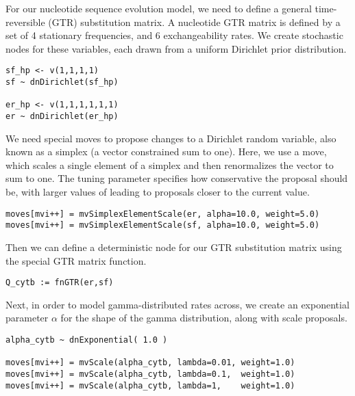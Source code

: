 For our nucleotide sequence evolution model, we need to define a general time-reversible (GTR) substitution matrix.
A nucleotide GTR matrix is defined by a set of 4 stationary frequencies, and 6 exchangeability rates.
We create stochastic nodes for these variables, each drawn from a uniform Dirichlet prior distribution.

{\tt \begin{snugshade*}
\begin{lstlisting}
sf_hp <- v(1,1,1,1)
sf ~ dnDirichlet(sf_hp)

er_hp <- v(1,1,1,1,1,1)
er ~ dnDirichlet(er_hp)
\end{lstlisting}
\end{snugshade*}}

We need special moves to propose changes to a Dirichlet random variable, also known as a simplex (a vector constrained sum to one).
Here, we use a  move, which scales a single element of a simplex and then renormalizes the vector to sum to one.
The tuning parameter  specifies how conservative the proposal should be, with larger values of  leading to proposals closer to the current value.
{\tt \begin{snugshade*}
\begin{lstlisting}
moves[mvi++] = mvSimplexElementScale(er, alpha=10.0, weight=5.0)
moves[mvi++] = mvSimplexElementScale(sf, alpha=10.0, weight=5.0)
\end{lstlisting}
\end{snugshade*}}

Then we can define a deterministic node for our GTR substitution matrix using the special GTR matrix function.
{\tt \begin{snugshade*}
\begin{lstlisting}
Q_cytb := fnGTR(er,sf)
\end{lstlisting}
\end{snugshade*}}

Next, in order to model gamma-distributed rates across, we create an exponential parameter $\alpha$ for the shape of the gamma distribution, along with scale proposals.
{\tt \begin{snugshade*}
\begin{lstlisting}
alpha_cytb ~ dnExponential( 1.0 )

moves[mvi++] = mvScale(alpha_cytb, lambda=0.01, weight=1.0)
moves[mvi++] = mvScale(alpha_cytb, lambda=0.1,  weight=1.0)
moves[mvi++] = mvScale(alpha_cytb, lambda=1,    weight=1.0)
\end{lstlisting}
\end{snugshade*}}

